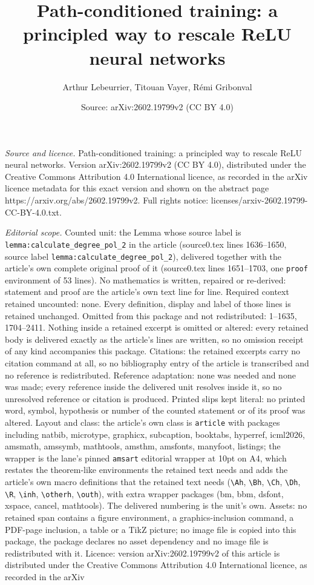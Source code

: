 \documentclass[10pt,a4paper]{amsart}
\title[Path-conditioned training: a principled way to rescale ReLU ]{Path-conditioned training: a principled way to rescale ReLU neural networks}
\author{Arthur Lebeurrier, Titouan Vayer, R\'emi Gribonval}
\date{Source: arXiv:2602.19799v2 (CC BY 4.0)}
\begin{document}
\maketitle

\noindent\emph{Source and licence.} Path-conditioned training: a principled way to rescale ReLU neural networks. Version arXiv:2602.19799v2 (CC BY 4.0), distributed under the Creative Commons Attribution 4.0 International licence, as recorded in the arXiv licence metadata for this exact version and shown on the abstract page https://arxiv.org/abs/2602.19799v2. Full rights notice: licenses/arxiv-2602.19799-CC-BY-4.0.txt.\par\smallskip

\noindent\textit{Editorial scope.} Counted unit: the Lemma whose source label is \texttt{lemma:calculate\_degree\_pol\_2} in the article (source0.tex lines 1636--1650, source label \texttt{lemma:calculate\_degree\_pol\_2}), delivered together with the article's own complete original proof of it (source0.tex lines 1651--1703, one \texttt{proof} environment of 53 lines). No mathematics is written, repaired or re-derived: statement and proof are the article's own text line for line. Required context retained uncounted: none. Every definition, display and label of those lines is retained unchanged. Omitted from this package and not redistributed: 1--1635, 1704--2411. Nothing inside a retained excerpt is omitted or altered: every retained body is delivered exactly as the article's lines are written, so no omission receipt of any kind accompanies this package. Citations: the retained excerpts carry no citation command at all, so no bibliography entry of the article is transcribed and no reference is redistributed. Reference adaptation: none was needed and none was made; every reference inside the delivered unit resolves inside it, so no unresolved reference or citation is produced. Printed slips kept literal: no printed word, symbol, hypothesis or number of the counted statement or of its proof was altered. Layout and class: the article's own class is \texttt{article} with packages including natbib, microtype, graphicx, subcaption, booktabs, hyperref, icml2026, amsmath, amssymb, mathtools, amsthm, amsfonts, manyfoot, listings; the wrapper is the lane's pinned \texttt{amsart} editorial wrapper at 10pt on A4, which restates the theorem-like environments the retained text needs and adds the article's own macro definitions that the retained text needs (\texttt{\textbackslash Ah}, \texttt{\textbackslash Bh}, \texttt{\textbackslash Ch}, \texttt{\textbackslash Dh}, \texttt{\textbackslash R}, \texttt{\textbackslash inh}, \texttt{\textbackslash otherh}, \texttt{\textbackslash outh}), with extra wrapper packages (bm, bbm, dsfont, xspace, cancel, mathtools). The delivered numbering is the unit's own. Assets: no retained span contains a figure environment, a graphics-inclusion command, a PDF-page inclusion, a table or a TikZ picture; no image file is copied into this package, the package declares no asset dependency and no image file is redistributed with it. Licence: version arXiv:2602.19799v2 of this article is distributed under the Creative Commons Attribution 4.0 International licence, as recorded in the arXiv 
\end{document}
